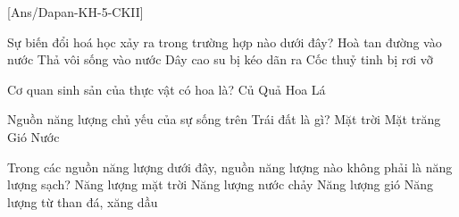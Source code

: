 \def\myytb{}
\def\myqrcodeytb{}
\def\myqrcodezalo{}
\def\quetmaqr{}
\def\thamgianhomhoctap{}
\newpage
\setcounter{ex}{0}
[Ans/Dapan-KH-5-CKII]
\hienthiloigiaiex
{}
\begin{ex}[M1-1 điểm]
	Sự biến đổi hoá học xảy ra trong trường hợp nào dưới đây?
	\choice
	{Hoà tan đường vào nước}
	{\True Thả vôi sống vào nước}
	{Dây cao su bị kéo dãn ra}
	{Cốc thuỷ tinh bị rơi vỡ}
	\loigiai{}
\end{ex}
\begin{ex}[M1-1 điểm]
	Cơ quan sinh sản của thực vật có hoa là?
	\choice
	{Củ}
	{Quả}
	{\True Hoa}
	{Lá}
	\loigiai{}
\end{ex}
\begin{ex}[M2-1 điểm]
	Nguồn năng lượng chủ yếu của sự sống trên Trái đất là gì?
	\choice
	{\True Mặt trời}
	{Mặt trăng}
	{Gió}
	{Nước}
	\loigiai{}
\end{ex}
\begin{ex}[M3-1 điểm]
	Trong các nguồn năng lượng dưới đây, nguồn năng lượng nào không phải là năng lượng sạch?
	\choice
	{Năng lượng mặt trời}
	{Năng lượng nước chảy}
	{Năng lượng gió}
	{\True Năng lượng từ than đá, xăng dầu}
	\loigiai{}
\end{ex}

